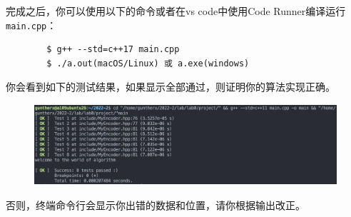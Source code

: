 \documentclass{article}
\begin{document}
完成之后，你可以使用以下的命令或者在vs code中使用Code Runner编译运行\texttt{main.cpp}：
\begin{lstlisting}
        $ g++ --std=c++17 main.cpp
        $ ./a.out(macOS/Linux) 或 a.exe(windows)
\end{lstlisting}

你会看到如下的测试结果，如果显示全部通过，则证明你的算法实现正确。

\begin{figure}[h]
    \centering
    \includegraphics[height=3cm]{img/lab0/lab0-1.png}
\end{figure}

否则，终端命令行会显示你出错的数据和位置，请你根据输出改正。
\end{document}
